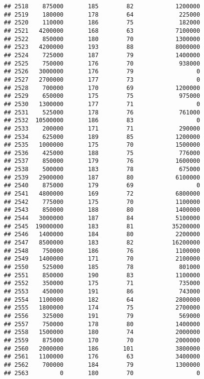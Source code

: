 \documentclass[
]{article}
\begin{document}
\begin{verbatim}
## 2518    875000       185        82            1200000
## 2519    180000       178        64             225000
## 2520    110000       186        75             182000
## 2521   4200000       168        63            7100000
## 2522    850000       180        70            1300000
## 2523   4200000       193        88            8000000
## 2524    725000       187        79            1400000
## 2525    750000       176        70             938000
## 2526   3000000       176        79                  0
## 2527   2700000       177        73                  0
## 2528    700000       170        69            1200000
## 2529    650000       175        75             975000
## 2530   1300000       177        71                  0
## 2531    525000       178        76             761000
## 2532  10500000       186        83                  0
## 2533    200000       171        71             290000
## 2534    625000       189        85            1200000
## 2535   1000000       175        70            1500000
## 2536    425000       188        75             776000
## 2537    850000       179        76            1600000
## 2538    500000       183        78             675000
## 2539   2900000       187        80            6100000
## 2540    875000       179        69                  0
## 2541   4800000       169        72            6800000
## 2542    775000       175        70            1100000
## 2543    850000       188        80            1400000
## 2544   3000000       187        84            5100000
## 2545  19000000       183        81           35200000
## 2546   1400000       184        80            2200000
## 2547   8500000       183        82           16200000
## 2548    750000       186        76            1100000
## 2549   1400000       171        70            2100000
## 2550    525000       185        78             801000
## 2551    850000       190        83            1100000
## 2552    350000       175        71             735000
## 2553    450000       191        86             743000
## 2554   1100000       182        64            2800000
## 2555   1800000       174        75            2700000
## 2556    325000       191        79             569000
## 2557    750000       178        80            1400000
## 2558   1500000       180        74            2000000
## 2559    875000       170        70            2000000
## 2560   2000000       186       101            3800000
## 2561   1100000       176        63            3400000
## 2562    700000       184        79            1300000
## 2563         0       180        70                  0

\end{verbatim}
\end{document}
